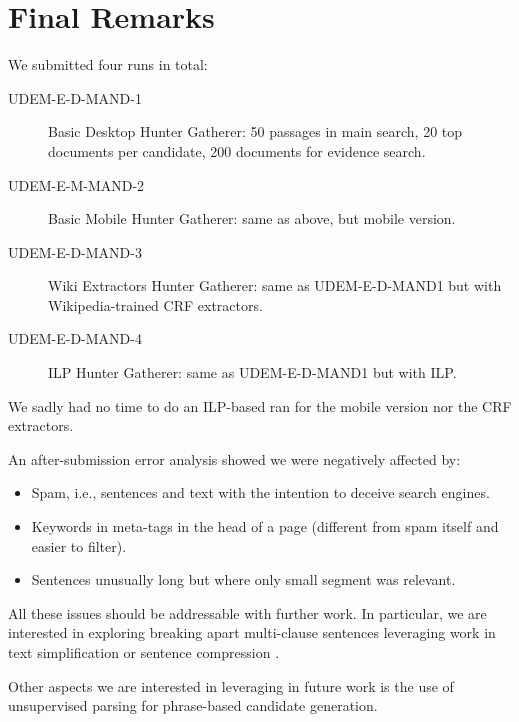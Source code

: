 \section{Final Remarks}

We submitted four runs in total:

\begin{description}

\item[UDEM-E-D-MAND-1] Basic Desktop Hunter Gatherer: 50 passages in main search, 20 top documents per candidate, 200 documents for evidence search.

\item[UDEM-E-M-MAND-2] Basic Mobile Hunter Gatherer: same as above, but mobile version.

\item[UDEM-E-D-MAND-3] Wiki Extractors Hunter Gatherer: same as UDEM-E-D-MAND1 but with Wikipedia-trained CRF extractors.

\item[UDEM-E-D-MAND-4] ILP Hunter Gatherer: same as UDEM-E-D-MAND1 but with ILP.

\end{description}

We sadly had no time to do an ILP-based ran for the mobile version nor
the CRF extractors. 

An after-submission error analysis showed we were negatively affected
by:

\begin{itemize}
\item Spam, i.e., sentences and text with the intention to deceive search engines.
\item Keywords in meta-tags in the head of a page (different from spam itself and easier to filter).
\item Sentences unusually long but where only small segment was relevant.
\end{itemize}

All these issues should be addressable with further work. In
particular, we are interested in exploring breaking apart multi-clause
sentences leveraging work in text simplification
\cite{siddharthan2006syntactic} or sentence compression
\cite{clarke2008global}.

Other aspects we are interested in leveraging in future work is the
use of unsupervised parsing \cite{seginer_etal_ACL07} for phrase-based
candidate generation.

